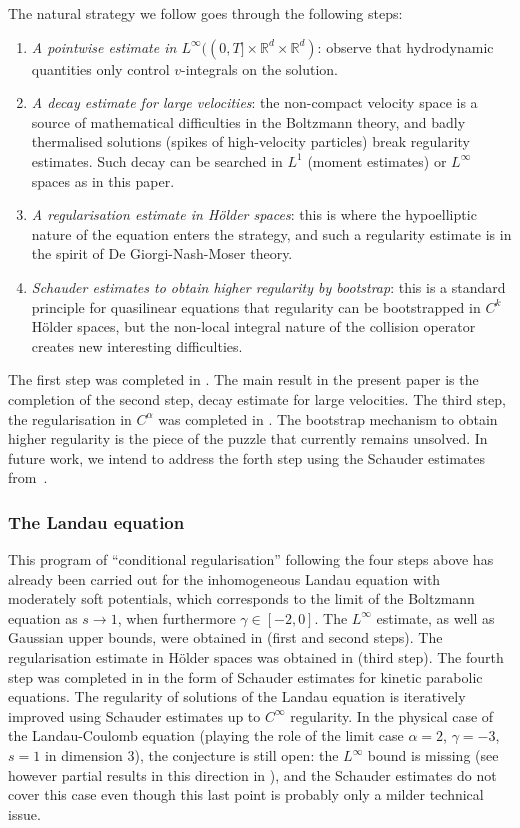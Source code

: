 \documentclass[JEP,XML,SOM,Unicode,NoFloatCountersInSection]{cedram}
\theoremstyle{plain}
\theoremstyle{definition}
\numberwithin{equation}{section}
\newcommand{\R}{\mathbb R}
\begin{document}
The natural strategy we follow goes through the following steps:
\begin{enumerate}
\item \emph{A pointwise estimate in
$L^\infty((0,T] \times \R^d \times \R^d)$}: observe that hydrodynamic
quantities only control $v$-integrals on the solution.
\item \emph{A decay estimate for large velocities}: the non-compact
velocity space is a source of mathematical difficulties in the
Boltzmann theory, and badly thermalised solutions (\eg spikes of
high-velocity particles) break regularity estimates. Such decay can
be searched in $L^1$ (moment estimates) or $L^\infty$ spaces as in
this paper.
\item \emph{A regularisation estimate in Hölder spaces}: this is
where the hypoelliptic nature of the equation enters the strategy,
and such a regularity estimate is in the spirit of De
Giorgi-Nash-Moser theory.
\item \emph{Schauder estimates to obtain higher regularity by
bootstrap}: this is a standard principle for quasilinear equations
that regularity can be bootstrapped in $C^{k}$ Hölder spaces, but
the non-local integral nature of the collision operator creates new
interesting difficulties.
\end{enumerate}

The first step was completed in \cite{luis}. The main result in the
present paper is the completion of the second step, \ie decay
estimate for large velocities. The third step, \ie the regularisation
in $C^\alpha$ was completed in \cite{is}. The bootstrap mechanism to
obtain higher regularity is the piece of the puzzle that currently
remains unsolved. In future work, we intend to address the forth step using the Schauder estimates from~\cite{imbert2018schauder}.

\subsubsection{The Landau equation} This program of ``conditional
regularisation'' following the four steps above has already been
carried out for the inhomogeneous Landau equation with moderately soft
potentials, which corresponds to the limit of the Boltzmann equation
as $s \to 1$, when furthermore $\gamma \in [-2,0]$. The $L^\infty$
estimate, as well as Gaussian upper bounds, were obtained in
\cite{css} (first and second steps). The regularisation estimate in
Hölder spaces was obtained in \cite{gimv} (third step). The fourth
step was completed in \cite{henderson2017c} in the form of Schauder
estimates for kinetic parabolic equations. The regularity of solutions
of the Landau equation is iteratively improved using Schauder
estimates up to $C^\infty$ regularity. In the physical case of the
Landau-Coulomb equation (playing the role of the limit case
$\alpha = 2$, $\gamma = -3$, $s=1$ in dimension $3$), the conjecture
is still open: the $L^\infty$ bound is missing (see however partial
results in this direction in \cite{luis-landau}), and the Schauder
estimates \cite{henderson2017c} do not cover this case even though
this last point is probably only a milder technical issue.
\end{document}
